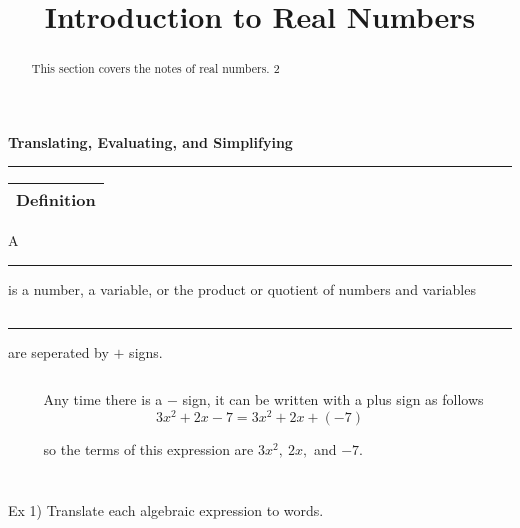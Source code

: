 \documentclass{ximera}
\title{Introduction to Real Numbers}
\begin{document}
\begin{abstract}
This section covers the notes of real numbers. 2
\end{abstract}


{\LARGE \hspace{1in} \textbf{ Translating, Evaluating, and Simplifying}}

\noindent \rule{7.35in}{2pt}

\vspace{.2in}

\noindent \begin{tabular}{|c|}
\hline 
Definition\\
\hline 
\end{tabular} A \rule{1in}{.5pt} is a number, a variable, or the product or quotient of numbers and variables

$~$

\rule{1in}{.5pt} are seperated by $\displaystyle +$ signs.

$~$

$~~~~~~~~~~$ Any time there is a $\displaystyle -$ sign, it can be written with a plus sign as follows $$3x^2+2x-7=3x^2+2x+(-7)$$ 

$~~~~~~~~~~$ so the terms of this expression are $3x^2, ~ 2x,$ and $-7$.

$~$

$~$



\noindent Ex 1)  Translate each algebraic expression to words.

$~$
\end{document}
